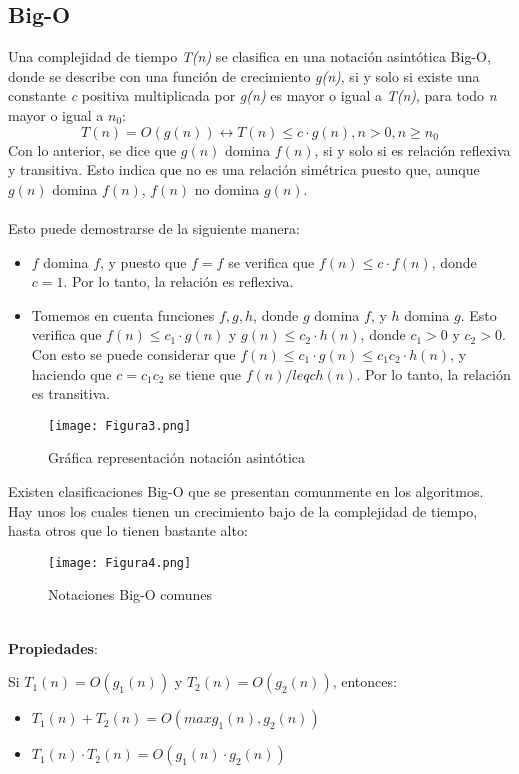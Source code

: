 \documentclass{article}
\begin{document}
\subsection{Big-O}
Una complejidad de tiempo \textit{T(n)} se clasifica en una notación asintótica Big-O, donde se describe con una función de crecimiento \textit{g(n)}, si y solo si existe una constante \textit{c} positiva multiplicada por \textit{g(n)} es mayor o igual a \textit{T(n)}, para todo \textit{n} mayor o igual a $n_0$:
$$T(n)=O(g(n))\leftrightarrow T(n)\leq c\cdot g(n), n>0,n\geq n_0$$
Con lo anterior, se dice que $g(n)$ domina $f(n)$, si y solo si es relación reflexiva y transitiva. Esto indica que no es una relación simétrica puesto que, aunque $g(n)$ domina $f(n)$, $f(n)$ no domina $g(n)$. 
\\\\
Esto puede demostrarse de la siguiente manera: 
\begin{itemize}
    \item $f$ domina $f$, y puesto que $f = f$ se verifica que $f(n) \leq c\cdot f(n)$, donde $c = 1$. Por lo tanto, la relación es reflexiva. 
    \item Tomemos en cuenta funciones $f,g,h$, donde $g$ domina $f$, y $h$ domina $g$. Esto verifica que $f(n)\leq c_1\cdot g(n)$ y $g(n) \leq c_2\cdot h(n)$, donde $c_1 > 0$ y $c_2 > 0$. Con esto se puede considerar que $f(n) \leq c_1\cdot g(n) \leq c_1 c_2\cdot h(n)$, y haciendo que $c = c_1c_2$ se tiene que $f(n) /leq c h(n)$. Por lo tanto, la relación es transitiva.
\end{itemize}
\begin{figure}[h]
    \centering
    \texttt{[image: Figura3.png]}
    \caption{Gráfica representación notación asintótica}
    \label{fig:3}
\end{figure}
Existen clasificaciones Big-O que se presentan comunmente en los algoritmos. Hay unos los cuales tienen un crecimiento bajo de la complejidad de tiempo, hasta otros que lo tienen bastante alto: 
\\
\begin{figure}[h]
    \centering
    \texttt{[image: Figura4.png]}
    \caption{Notaciones Big-O comunes}
    \label{fig:4}
\end{figure}
\\
\textbf{Propiedades}: 

Si $T_1(n)=O(g_1(n))$ y $T_2(n)=O(g_2(n))$, entonces: 
\begin{itemize}
    \item $T_1(n)+T_2(n)=O(max{g_1(n),g_2(n)})$
    \item $T_1(n)\cdot T_2(n)= O(g_1(n)\cdot g_2(n))$
\end{itemize}
\end{document}
